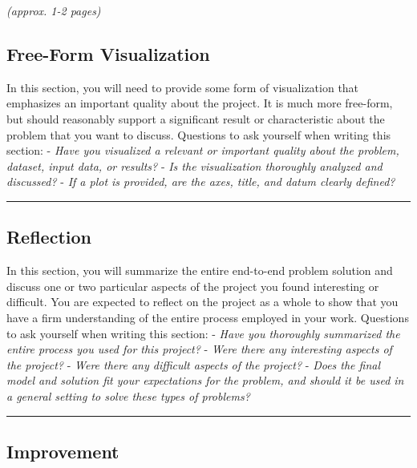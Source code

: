 \documentclass[12pt]{article}
\begin{document}
\begin{enumerate}
\emph{(approx. 1-2 pages)}

\subsection{Free-Form Visualization}\label{free-form-visualization}

In this section, you will need to provide some form of visualization
that emphasizes an important quality about the project. It is much more
free-form, but should reasonably support a significant result or
characteristic about the problem that you want to discuss. Questions to
ask yourself when writing this section: - \emph{Have you visualized a
relevant or important quality about the problem, dataset, input data, or
results?} - \emph{Is the visualization thoroughly analyzed and
discussed?} - \emph{If a plot is provided, are the axes, title, and
datum clearly defined?}

\begin{center}\rule{0.5\linewidth}{\linethickness}\end{center}

\subsection{Reflection}\label{reflection}

In this section, you will summarize the entire end-to-end problem
solution and discuss one or two particular aspects of the project you
found interesting or difficult. You are expected to reflect on the
project as a whole to show that you have a firm understanding of the
entire process employed in your work. Questions to ask yourself when
writing this section: - \emph{Have you thoroughly summarized the entire
process you used for this project?} - \emph{Were there any interesting
aspects of the project?} - \emph{Were there any difficult aspects of the
project?} - \emph{Does the final model and solution fit your
expectations for the problem, and should it be used in a general setting
to solve these types of problems?}

\begin{center}\rule{0.5\linewidth}{\linethickness}\end{center}

\subsection{Improvement}\label{improvement}


\end{enumerate}
\end{document}
